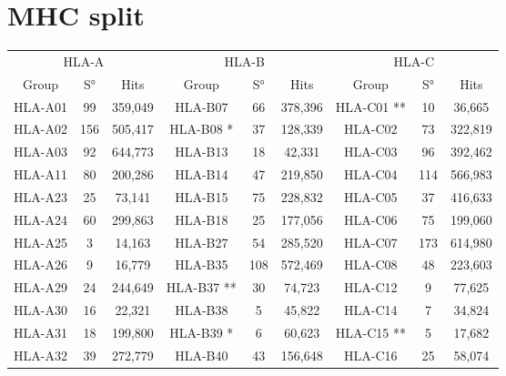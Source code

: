 \documentclass[msc,deptreport,ai]{infthesis} %
\begin{document}
	\section{MHC split}
		\vspace{-5mm}
		\begin{table}[H]
		\vskip 3mm
		\begin{center}
		\begin{footnotesize}
		\begin{sc}
		\begin{tabular}{| c c c | c c c | c c c |}
		\hline
		\multicolumn{3}{|c|}{HLA-A}					& \multicolumn{3}{|c|}{HLA-B}					&  \multicolumn{3}{|c|}{HLA-C} \\
		Group			& S°			& Hits	 		& Group		& S°			& Hits		 	& Group		& S°			& Hits \\
		\hline
		HLA-A01   		& 99			& 359,049		& HLA-B07   		& 66   			& 378,396		& HLA-C01 **	& 10   			&  36,665 \\
		HLA-A02   		& 156			& 505,417		& HLA-B08 * 		& 37   			& 128,339 		& HLA-C02   		& 73   			& 322,819\\
		HLA-A03   		& 92   			& 644,773		& HLA-B13   		& 18   			&  42,331 		& HLA-C03   		& 96   			& 392,462\\
		HLA-A11   		& 80   			& 200,286		& HLA-B14   		& 47   			& 219,850 		& HLA-C04   		& 114   		& 566,983\\
		HLA-A23   		& 25   			&  73,141		& HLA-B15   		& 75   			& 228,832 		& HLA-C05   		& 37   			& 416,633\\
		HLA-A24   		& 60   			& 299,863		& HLA-B18   		& 25   			& 177,056 		& HLA-C06   		& 75   			& 199,060\\
		HLA-A25   		&  3   			&  14,163		& HLA-B27   		& 54   			& 285,520 		& HLA-C07   		& 173   		& 614,980\\
		HLA-A26   		&  9   			&  16,779		& HLA-B35   		& 108   		& 572,469 		& HLA-C08   		& 48   			& 223,603\\
		HLA-A29   		& 24   			& 244,649		& HLA-B37 **	& 30   			&  74,723 		& HLA-C12   		&  9   			&  77,625\\
		HLA-A30   		& 16   			&  22,321		& HLA-B38   		&  5   			&  45,822 		& HLA-C14   		&  7   			&  34,824\\
		HLA-A31   		& 18   			& 199,800		& HLA-B39 *		&  6   			&  60,623 		& HLA-C15 **	&  5   			&  17,682\\
		HLA-A32   		& 39   			& 272,779		& HLA-B40   		& 43   			& 156,648 		& HLA-C16   		& 25   			&  58,074\\

\end{tabular}
\end{sc}
\end{footnotesize}
\end{center}
\end{table}
\end{document}
